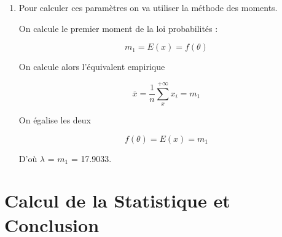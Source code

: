 \documentclass[a4paper,oneside]{article}
\begin{document}
\begin{enumerate}
\item

Pour calculer ces paramètres on va utiliser la méthode des moments.

On calcule le premier moment de la loi probabilités :

\[
 m_1 = E(x) = f(\theta)
\]

On calcule alors l'équivalent empirique

\[
\overline{x}=\frac{1}{n} \sum_{x}^{+\infty} x_i = m_1
 \]

 On égalise les deux

\[
 f(\theta) =  E(x) = m_1
 \]

D'où $\lambda$ =  $m_1$ = 17.9033.


\end{enumerate}

\section{Calcul de la Statistique et Conclusion}
\end{document}
